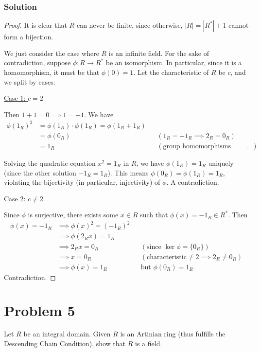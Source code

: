 \documentclass{article}
\theoremstyle{plain}
\begin{document}
\subsubsection*{Solution}
\begin{proof}
  It is clear that $R$ can never be finite, since otherwise, $|R|=|R^{*}|+1$ cannot
  form a bijection.\medskip

  We just consider the case where $R$ is an infinite field. For the sake of
  contradiction, suppose $\phi:R\to R^{*}$ be an isomorphism. In particular, since it
  is a homomorphism, it must be that $\phi(0)=1$. Let the characteristic of $R$ be $c$,
  and we split by cases:\medskip

  \underline{Case 1: $c=2$}

  Then $1+1=0\implies 1=-1$. We have
  \begin{align*}
    \phi(1_{R})^{2}&=\phi(1_{R})\cdot\phi(1_{R})=\phi(1_{R}+1_{R})\\
            &=\phi(0_{R})&& (1_{R}=-1_{R}\implies2_{R}=0_{R})\\
              &=1_{R} && (\text{group homomorphisms preserve identity}).
  \end{align*}

  Solving the quadratic equation $x^{2}=1_{R}$ in $R$, we have $\phi(1_{R})=1_{R}$ uniquely (since the
  other solution $-1_{R}=1_{R}$). This means $\phi(0_{R})=\phi(1_{R})=1_{R}$, violating the bijectivity
  (in particular, injectivity) of $\phi$. A contradiction.\medskip

  \underline{Case 2: $c\ne2$}

  Since $\phi$ is surjective, there exists some $x\in R$ such that $\phi(x)=-1_{R}\in R^{*}$. Then
  \begin{align*}
    \phi(x)=-1_{R}&\implies\phi(x)^{2}=(-1_{R})^{2}\\
           &\implies\phi(2_{R}x)=1_{R}\\
           &\implies 2_{R}x=0_{R}&& (\text{since }\ker\phi=\{0_{R}\})\\
           &\implies x=0_{R} && (\text{characteristic}\ne2\implies2_{R}\ne0_{R})\\
           &\implies \phi(x)=1_{R} &&\text{but }\phi(0_{R})=1_{R}.
  \end{align*}
  Contradiction.
\end{proof}

\section*{Problem 5}
Let $R$ be an integral domain. Given $R$ is an Artinian ring (thus fulfills the
Descending Chain Condition), show that $R$ is a field.
\end{document}
